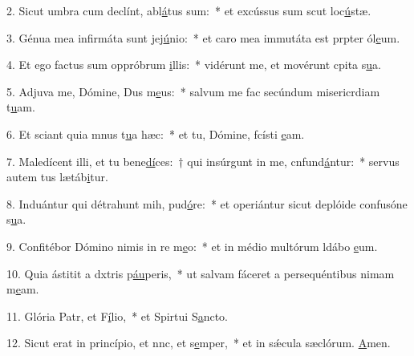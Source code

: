 2. Sicut umbra cum declínt, abl\uline{á}tus sum:~* et excússus sum scut loc\uline{ú}stæ.\par 
3. Génua mea infirmáta sunt  jej\uline{ú}nio:~* et caro mea immutáta est prpter ól\uline{e}um.\par 
4. Et ego factus sum oppróbrum \uline{i}llis:~* vidérunt me, et movérunt cpita s\uline{u}a.\par 
5. Adjuva me, Dómine, Dus m\uline{e}us:~* salvum me fac secúndum misericrdiam t\uline{u}am.\par 
6. Et sciant quia mnus t\uline{u}a hæc:~* et tu, Dómine, fcísti \uline{e}am.\par 
7. Maledícent illi, et tu bene\uline{dí}ces:~† qui insúrgunt in me, cnfund\uline{á}ntur:~* servus autem tus lætáb\uline{i}tur.\par 
8. Induántur qui détrahunt mih, pud\uline{ó}re:~* et operiántur sicut deplóide confusóne s\uline{u}a.\par 
9. Confitébor Dómino nimis in re m\uline{e}o:~* et in médio multórum ldábo \uline{e}um.\par 
10. Quia ástitit a dxtris p\uline{áu}peris,~* ut salvam fáceret a persequéntibus nimam m\uline{e}am.\par 
11. Glória Patr, et F\uline{í}lio,~* et Spirtui S\uline{a}ncto.\par 
12. Sicut erat in princípio, et nnc, et s\uline{e}mper,~* et in sǽcula sæclórum. \uline{A}men.\par 
